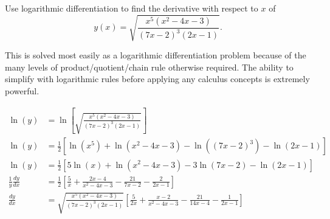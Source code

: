 \documentclass{ximera}
\author{Emma Smith Zbarsky}
\begin{document}
\begin{exercise}

Use logarithmic differentiation to find the derivative with respect to
$x$ of \[y(x) = \sqrt{\frac{x^5(x^2-4x-3)}{(7x-2)^3(2x-1)}}.\]


\begin{hint}
This is solved most easily as a logarithmic differentiation problem
because of the many levels of product/quotient/chain rule otherwise
required. The ability to simplify with logarithmic rules before applying
any calculus concepts is extremely powerful.
\end{hint}


\begin{hint}
\begin{align*}
\ln(y) &= \ln\left[\sqrt{\frac{x^5(x^2-4x-3)}{(7x-2)^3(2x-1)}}\right] \\
\ln(y) &= \frac{1}{2}\left[\ln(x^5)+\ln(x^2-4x-3)-\ln\left((7x-2)^3\right)-\ln(2x-1)\right] \\
\ln(y) &= \frac{1}{2}\left[5\ln(x) + \ln(x^2-4x-3)-3\ln(7x-2)-\ln(2x-1)\right] \\
\frac{1}{y}\frac{dy}{dx} &= \frac{1}{2}\left[\frac{5}{x}+\frac{2x-4}{x^2-4x-3}-\frac{21}{7x-2}-\frac{2}{2x-1}\right] \\
\frac{dy}{dx} &= \sqrt{\frac{x^5(x^2-4x-3)}{(7x-2)^3(2x-1)}}\left[\frac{5}{2x}+\frac{x-2}{x^2-4x-3}-\frac{21}{14x-4}-\frac{1}{2x-1}\right] \end{align*}
\end{hint}


\begin{multipleChoice}
\end{multipleChoice}

\end{exercise}
\end{document}
